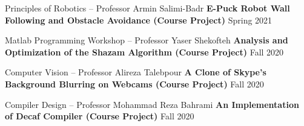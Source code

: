   \begin{cventries}
    
    \cventry
    {Principles of Robotics -- Professor Armin Salimi-Badr}
    {\textbf {E-Puck Robot Wall Following and Obstacle Avoidance (Course Project)}}
    {}
    {Spring 2021}
    {}
    \vspace{0.0 cm}
  \end{cventries}
  \begin{cventries}
    
    \cventry
    {Matlab Programming Workshop -- Professor Yaser Shekofteh}
    {\textbf {Analysis and Optimization of the Shazam Algorithm (Course Project)}}
    {}
    {Fall 2020}
    {}
    \vspace{0.0 cm}
  \end{cventries}
  \begin{cventries}
    
    \cventry
    {Computer Vision -- Professor Alireza Talebpour}
    {\textbf {A Clone of Skype's Background Blurring on Webcams (Course Project)}}
    {}
    {Fall 2020}
    {}
    \vspace{0.0 cm}
  \end{cventries}
  \begin{cventries}

    \cventry
    {Compiler Design -- Professor Mohammad Reza Bahrami}
    {\textbf {An Implementation of Decaf Compiler (Course Project)}}
    {}
    {Fall 2020}
    {}
    \vspace{0.0 cm}
  \end{cventries}
